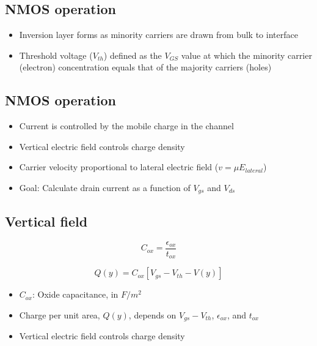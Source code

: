 \documentclass[11pt]{article}
\providecommand{\tightlist}{%
      \setlength{\itemsep}{0pt}\setlength{\parskip}{0pt}}
\begin{document}
    \hypertarget{nmos-operation}{%
\subsection{NMOS operation}\label{nmos-operation}}

    

    \begin{itemize}
\tightlist
\item
  Inversion layer forms as minority carriers are drawn from bulk to
  interface
\item
  Threshold voltage (\(V_{th}\)) defined as the \(V_{GS}\) value at
  which the minority carrier (electron) concentration equals that of the
  majority carriers (holes)
\end{itemize}

    \hypertarget{nmos-operation}{%
\subsection{NMOS operation}\label{nmos-operation}}

    

    \begin{itemize}
\tightlist
\item
  Current is controlled by the mobile charge in the channel
\item
  Vertical electric field controls charge density
\item
  Carrier velocity proportional to lateral electric field
  (\(v=\mu E_{lateral}\))
\item
  Goal: Calculate drain current as a function of \(V_{gs}\) and
  \(V_{ds}\)
\end{itemize}

    \hypertarget{vertical-field}{%
\subsection{Vertical field}\label{vertical-field}}

    

    \begin{equation}
C_{ox} = \dfrac{\epsilon_{ox}}{t_{ox}}
\end{equation}

\begin{equation}
Q(y) = C_{ox}[V_{gs} - V_{th} - V(y)]
\end{equation}

    \begin{itemize}
\tightlist
\item
  \(C_{ox}\): Oxide capacitance, in \(F/m^2\)
\item
  Charge per unit area, \(Q(y)\), depends on \(V_{gs} - V_{th}\),
  \(\epsilon_{ox}\), and \(t_{ox}\)
\item
  Vertical electric field controls charge density
\end{itemize}
\end{document}
